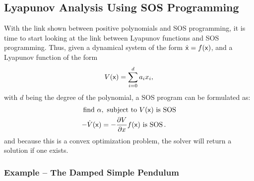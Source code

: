 \subsection{Lyapunov Analysis Using SOS Programming}

With the link shown between positive polynomials and \ac{SOS} programming, it is
time to start looking at the link between Lyapunov functions and SOS
programming. Thus, given a dynamical system of the form \(\dot{{\mathbf{\mathsf{x}}}} =
f({\mathbf{\mathsf{x}}})\), and a Lyapunov function of the form
\[
  V({\mathbf{\mathsf{x}}}) = \sum_{i=0}^{d} a_{i}x_{i},
\]
with \(d\) being the degree of the polynomial, a \ac{SOS} program can be
formulated as:
\begin{align*}
  \text{find \(\alpha\)}&, \text{ subject to } V({\mathbf{\mathsf{x}}}) \text{ is SOS}\\
  -\dot{V}({\mathbf{\mathsf{x}}}) &= -\frac{\partial V}{\partial x}f({\mathbf{\mathsf{x}}}) \text{ is SOS} \, .
\end{align*}
and because this is a convex optimization problem, the solver will return a
solution if one exists.

\subsubsection{Example -- The Damped Simple Pendulum}

